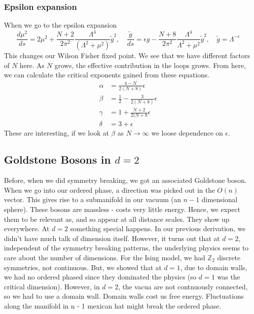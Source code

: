 \subsubsection{Epsilon expansion} 

When we go to the epsilon expansion 
\[
\frac{ d \mu ^ 2 }{ ds } = 2 \mu ^ 2 + \frac{N + 2 }{ 2 \pi ^ 2 } \frac{ \Lambda ^ 4 }{ 
( \Lambda ^ 2 + \mu ^ 2 ) } \tilde{ g } ^ 2, \quad 
\frac{ \tilde{ g }  }{ ds }  = \epsilon g  - \frac{ N +  8 }{  2 \pi ^ 2 }  \frac{ \Lambda ^ 4 }{ 
\Lambda ^ 2+ \mu ^ 2 } \tilde{ g } ^ 2, \quad \tilde{ g }  = \Lambda ^{ - \epsilon }  
\] This changes our Wilson Fisher fixed point. We see that 
we have different factors of $ N $ here. 
As $ N  $ grows, the effective contribution in the loops grows. 
From here, we can calculate the critical exponents gained from 
these equations. 
\begin{align*}
\alpha &=  \frac{4 - N }{ 2 ( N + 8 ) } \epsilon  \\
\beta &=  \frac{1}{2 } - \frac{ 3 }{ 2 ( N + 8 ) } \epsilon  \\
\gamma &=  1 + \frac{ N + 2 }{ 2 ( N + 8  } \epsilon \\
\delta &=  3  + \epsilon  
\end{align*}
These are interesting, if we look at $ \beta $ as 
$ N \to \infty $ we loose dependence on $\epsilon$. 

\subsection{Goldstone Bosons in $ d = 2 $} 
Before, when we did symmetry breaking, we got an associated Goldstone boson. 
When we go into our ordered phase, a direction was picked out in the $ O ( n )  $ vector. 
This gives rise to a submanifold in our vacuum (an $ n -1 $ dimensional sphere). 
These bosons are massless - costs very little energy. 
Hence, we expect them to be relevant as, and so appear at all distance scales. 
They show up everywhere. 
At $ d =2 $ something special happens. 
In our previous derivation, we didn't have much talk of dimension itself. 
However, it turns out that at $ d = 2$, independent of the symmetry breaking patterns, 
the underlying physics seems to care about the number of dimensions. 
For the Ising model, we had $ \mathbb{ Z} _ 2 $ discrete symmetries, not continuous. 
But, we showed that at $ d = 1 $, due to domain walls, we had no ordered phased 
since they dominated the physics (so $ d = 1 $ was the critical dimension). 
However, in $ d = 2 $, the vacua are not contnuously connected, so 
we had to use a domain wall. Domain walls cost us free energy. Fluctuations 
along the manifold in n - 1 mexican hat might break the ordered phase. 

